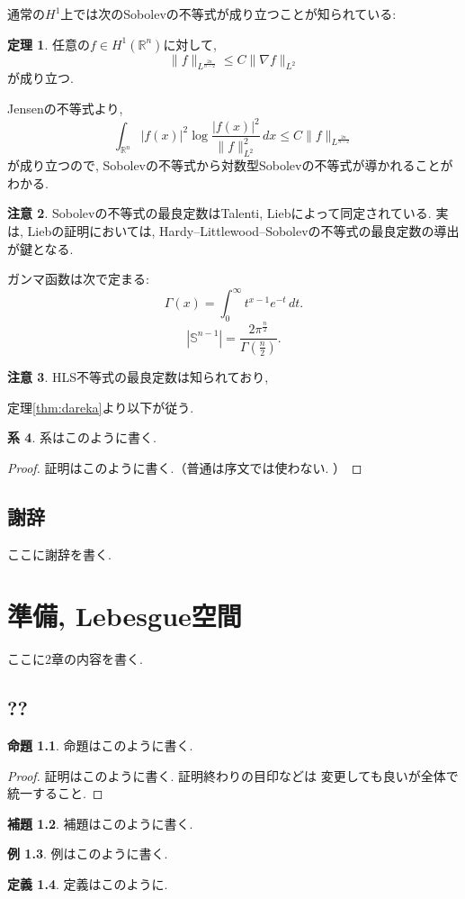 \documentclass[12pt,a4j,twoside]{jreport}
\numberwithin{equation}{chapter}
\theoremstyle{definition} %
\newtheorem{thm}{定理}[chapter]
\newtheorem{prop}[thm]{命題}
\newtheorem{lem}[thm]{補題}
\newtheorem{cor}[thm]{系}
\newtheorem{dfn}[thm]{定義}
\newtheorem{ex}[thm]{例}
\newtheorem{rem}[thm]{注意}
\newcommand{\R}{{\mathbb R}} %
\newcommand{\Gm}{\Gamma} %
\newcommand{\Sp}{{\mathbb S}} %
\newcommand{\nab}{\nabla} %
\newcommand{\eqn}[1]{\begin{equation}#1\end{equation}}
\begin{document}
通常の$H^1$上では次のSobolevの不等式が成り立つことが知られている:


\begin{thm}
任意の$f \in H^1(\R^n)$に対して, 
\eqn{
  \|f\|_{L^\frac{2 n}{n - 2}}
  \leq C \|\nab f\|_{L^2}
}
が成り立つ. 
\end{thm}


Jensenの不等式より, 
\eqn{
  \int_{\R^n} |f(x)|^2 \log\frac{|f(x)|^2}{\|f\|_{L^2}^2}\, dx
  \leq C \|f\|_{L^\frac{2 n}{n - 2}}
}
が成り立つので, Sobolevの不等式から対数型Sobolevの不等式が導かれることがわかる. 


\begin{rem}
Sobolevの不等式の最良定数はTalenti, Liebによって同定されている. 
実は, Liebの証明においては, Hardy--Littlewood--Sobolevの不等式の最良定数の導出が鍵となる. 

\end{rem}


ガンマ函数は次で定まる:
\eqn{
  \Gm(x) = \int_0^\infty t^{x - 1} e^{- t}\, dt.
}
\eqn{
  \left|\Sp^{n - 1}\right|
  = \frac{2 \pi^\frac{n}{2}}{\Gm\left(\frac{n}{2}\right)}.
}




\begin{rem}
HLS不等式の最良定数は知られており, 
\end{rem}

定理\ref{thm:dareka}より以下が従う. 

\begin{cor}
系はこのように書く. 
\end{cor}

\begin{proof}
証明はこのように書く.（普通は序文では使わない. ）
\end{proof}

\section*{謝辞}
ここに謝辞を書く. 

\chapter{準備, Lebesgue空間}

ここに2章の内容を書く. 

\section{??}

\begin{prop}
命題はこのように書く. 
\end{prop}
\begin{proof}
証明はこのように書く. 証明終わりの目印などは
変更しても良いが全体で統一すること. 
\end{proof}
\begin{lem}
補題はこのように書く. 
\end{lem}
\begin{ex}
例はこのように書く. 
\end{ex}
\begin{dfn}
定義はこのように. 
\end{dfn}
\end{document}
